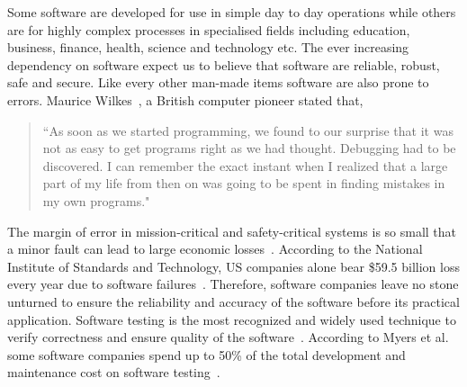 Some software are developed for use in simple day to day operations while others are for highly complex processes in specialised fields including education, business, finance, health, science and technology etc. The ever increasing dependency on software expect us to believe that software are reliable, robust, safe and secure. Like every other man-made items software are also prone to errors. Maurice Wilkes~\cite{wilkes1985memoirs}, a British computer pioneer stated that,
\begin{quote}
``As soon as we started programming, we found to our surprise that it was not as easy to get programs right as we had thought. Debugging had to be discovered. I can remember the exact instant when I realized that a large part of my life from then on was going to be spent in finding mistakes in my own programs."
\end{quote}
The margin of error in mission-critical and safety-critical systems is so small that a minor fault can lead to large economic losses~\cite{huang2004securing}. According to the National Institute of Standards and Technology, US companies alone bear \$59.5 billion loss every year due to software failures~\cite{tassey2002economic}. Therefore, software companies leave no stone unturned to ensure the reliability and accuracy of the software before its practical application. Software testing is the most recognized and widely used technique to verify correctness and ensure quality of the software~\cite{patton2001software}. According to Myers et al. some software companies spend up to 50\% of the total development and maintenance cost on software testing~\cite{myers2011art}. 

